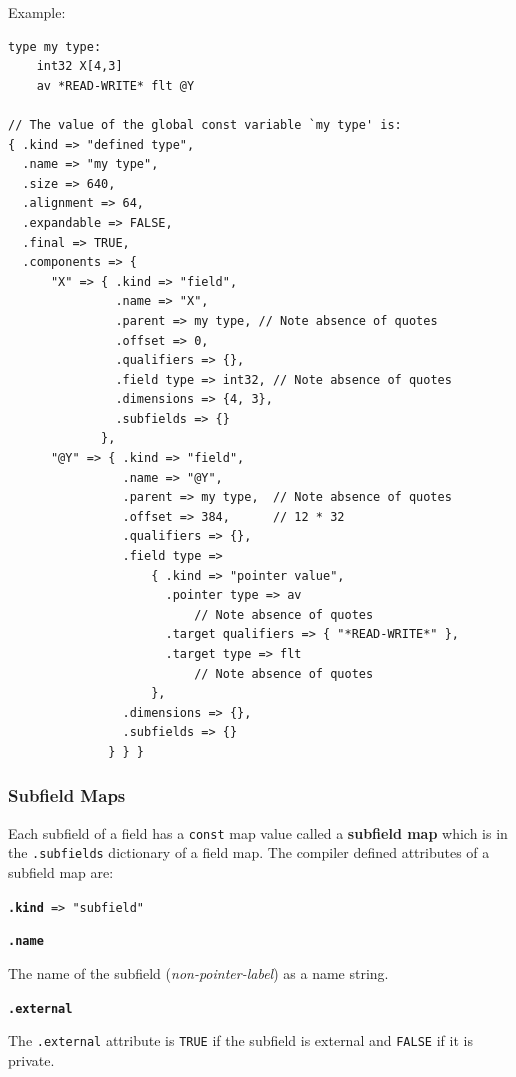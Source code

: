 \documentclass[12pt]{article}
\newcommand{\key}[1]{{\rm \bfseries #1}}
\newcommand{\ttkey}[1]{{\tt \bfseries #1}}
\newenvironment{indpar}[1][0.3in]%
	{\begin{list}{}%
		     {\setlength{\itemsep}{0in}%
		      \setlength{\topsep}{0in}%
		      \setlength{\parsep}{1ex}%
		      \setlength{\labelwidth}{#1}%
		      \setlength{\leftmargin}{#1}%
		      \addtolength{\leftmargin}{\labelsep}}%
	 \item}%
	{\end{list}}
\begin{document}
Example:
\begin{indpar}\begin{verbatim}
type my type:
    int32 X[4,3]
    av *READ-WRITE* flt @Y

// The value of the global const variable `my type' is:
{ .kind => "defined type",
  .name => "my type",
  .size => 640,
  .alignment => 64,
  .expandable => FALSE,
  .final => TRUE,
  .components => {
      "X" => { .kind => "field",
               .name => "X",
               .parent => my type, // Note absence of quotes
               .offset => 0,
               .qualifiers => {},
               .field type => int32, // Note absence of quotes
               .dimensions => {4, 3},
               .subfields => {}
             },
      "@Y" => { .kind => "field",
                .name => "@Y",
                .parent => my type,  // Note absence of quotes
                .offset => 384,      // 12 * 32
                .qualifiers => {},
                .field type =>
                    { .kind => "pointer value",
                      .pointer type => av
                          // Note absence of quotes
                      .target qualifiers => { "*READ-WRITE*" },
                      .target type => flt
                          // Note absence of quotes
                    },
                .dimensions => {},
                .subfields => {}
              } } }

\end{verbatim}\end{indpar}

\subsubsection{Subfield Maps}
\label{SUBFIELD-MAPS}

Each subfield of a field has a {\tt const} map value called
a \key{subfield map} which is in the {\tt .subfields} dictionary of
a field map.  The compiler defined attributes of a subfield map are:

{\tt \ttkey{.kind} => "subfield"}

\ttkey{.name}
\begin{indpar}
The name of the subfield ({\em non-pointer-label})
as a name string.
\end{indpar}

\ttkey{.external}
\begin{indpar}
The {\tt .external} attribute is {\tt TRUE} if the subfield
is external and {\tt FALSE} if it is private.
\end{indpar}
\end{document}
